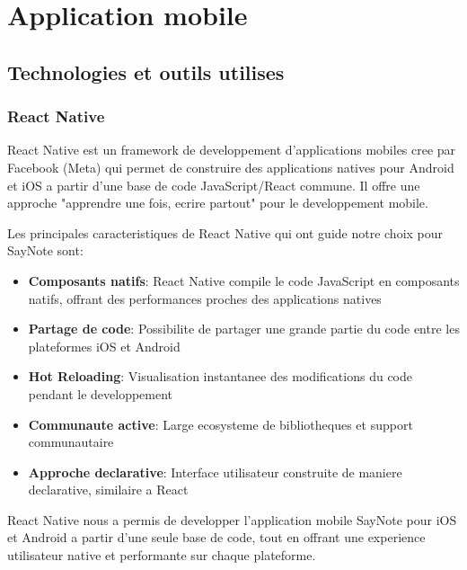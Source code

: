 \section{Application mobile}
\subsection{Technologies et outils utilises}

\subsubsection{React Native}
\begin{minipage}{0.7\textwidth}
React Native est un framework de developpement d'applications mobiles cree par Facebook (Meta) qui permet de construire des applications natives pour Android et iOS a partir d'une base de code JavaScript/React commune. Il offre une approche "apprendre une fois, ecrire partout" pour le developpement mobile.

Les principales caracteristiques de React Native qui ont guide notre choix pour SayNote sont:

\begin{itemize}
    \item \textbf{Composants natifs}: React Native compile le code JavaScript en composants natifs, offrant des performances proches des applications natives
    \item \textbf{Partage de code}: Possibilite de partager une grande partie du code entre les plateformes iOS et Android
    \item \textbf{Hot Reloading}: Visualisation instantanee des modifications du code pendant le developpement
    \item \textbf{Communaute active}: Large ecosysteme de bibliotheques et support communautaire
    \item \textbf{Approche declarative}: Interface utilisateur construite de maniere declarative, similaire a React
\end{itemize}

React Native nous a permis de developper l'application mobile SayNote pour iOS et Android a partir d'une seule base de code, tout en offrant une experience utilisateur native et performante sur chaque plateforme.
\end{minipage}%
\hfill
